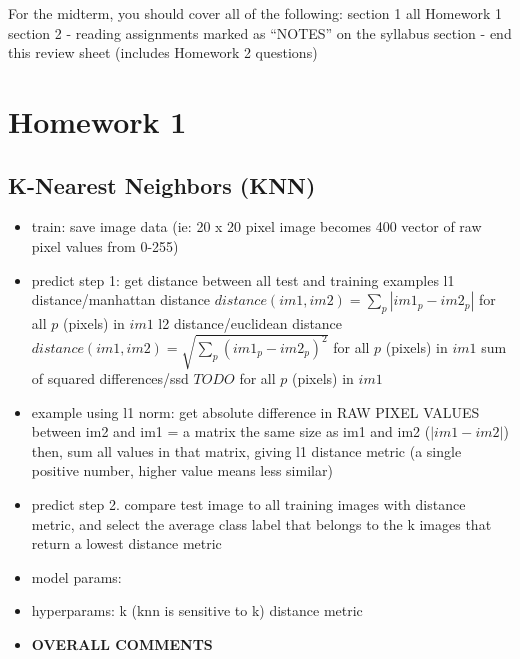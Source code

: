 \documentclass[10pt,letterpaper]{article}
\date{}
\begin{document}
For the midterm, you should cover all of the following:
\subitem section 1 all Homework 1
\subitem section 2 - reading assignments marked as “NOTES” on the syllabus
\subitem section  - end this review sheet (includes Homework 2 questions)

\section{Homework 1}
\begin{solution}
\subsection{K-Nearest Neighbors (KNN)}
\begin{itemize}
\item train: save image data (ie: 20 x 20 pixel image becomes 400 vector of raw pixel values from 0-255)
\item predict step 1: get distance between all test and training examples
\newline
\newline l1 distance/manhattan distance
\newline $distance(im1, im2) = \sum_p{|im1_p - im2_p|}$ for all $p$ (pixels) in $im1$ 
\newline l2 distance/euclidean distance
\newline $distance(im1, im2) = \sqrt{\sum_p{(im1_p - im2_p)^2}}$ for all $p$ (pixels) in $im1$ 
\newline sum of squared differences/ssd
\newline $TODO$ for all $p$ (pixels) in $im1$ 
\item example using l1 norm: 
\subitem get absolute difference in RAW PIXEL VALUES between im2 and im1
\subitem  = a matrix the same size as im1 and im2 ($|im1-im2|$)  
\subitem then, sum all values in that matrix, giving l1 distance metric 
\subitem (a single positive number, higher value means less similar)
\item predict step 2. compare test image to all training images with distance metric, and select the average class label that belongs to the k images that return a lowest distance metric
\item model params:
\item hyperparams:
\subitem k (knn is sensitive to k)
\subitem distance metric
\item \textbf{OVERALL COMMENTS}
\subitem
\subitem
\subitem
\end{itemize}
\end{solution}
\end{document}
